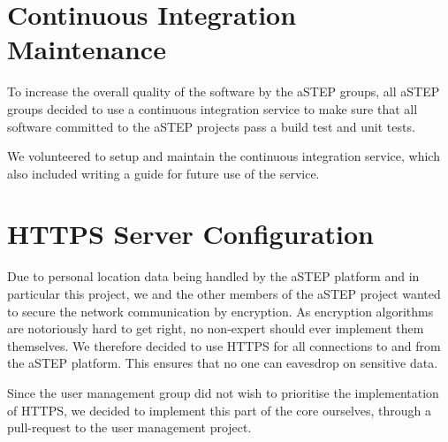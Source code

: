 \section{Continuous Integration Maintenance}
To increase the overall quality of the software by the aSTEP groups, all aSTEP groups decided to use a continuous integration service to make sure that all software committed to the aSTEP projects pass a build test and unit tests.

We volunteered to setup and maintain the continuous integration service, which also included writing a guide for future use of the service.

\section{HTTPS Server Configuration}
Due to personal location data being handled by the aSTEP platform and in particular this project, we and the other members of the aSTEP project wanted to secure the network communication by encryption. As encryption algorithms are notoriously hard to get right, no non-expert should ever implement them themselves. We therefore decided to use HTTPS for all connections to and from the aSTEP platform. This ensures that no one can eavesdrop on sensitive data.

Since the user management group did not wish to prioritise the implementation of HTTPS, we decided to implement this part of the core ourselves, through a pull-request to the user management project.










